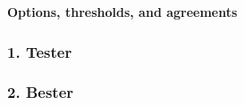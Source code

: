 \documentclass[letterpaper, 12pt]{article}
\begin{document}
\begin{center}
\textbf{\normalsize Options, thresholds, and agreements}
\end{center}
\subsubsection{1. Tester}
\lipsum[1]
\subsubsection{2. Bester}
\lipsum[2]


%
%
\end{document}
